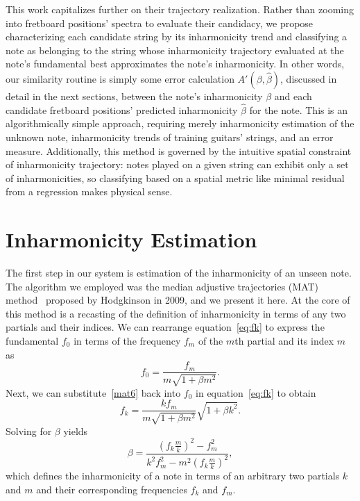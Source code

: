 \documentclass[12pt]{cmuthesis}
\begin{document}
This work capitalizes further on their trajectory realization. Rather than zooming into fretboard positions' spectra to evaluate their candidacy, we propose characterizing each candidate string by its inharmonicity trend and classifying a note as belonging to the string whose inharmonicity trajectory evaluated at the note's fundamental best approximates the note's inharmonicity. In other words, our similarity routine is simply some error calculation $A'(\beta,\hat{\beta})$, discussed in detail in the next sections, between the note's inharmonicity $\beta$ and each candidate fretboard positions' predicted inharmonicity $\hat{\beta}$ for the note. This is an algorithmically simple approach, requiring merely inharmonicity estimation of the unknown note, inharmonicity trends of training guitars' strings, and an error measure. Additionally, this method is governed by the intuitive spatial constraint of inharmonicity trajectory: notes played on a given string can exhibit only a set of inharmonicities, so classifying based on a spatial metric like minimal residual from a regression makes physical sense.

\section{Inharmonicity Estimation}
The first step in our system is estimation of the inharmonicity of an unseen note. The algorithm we employed was the median adjustive trajectories (MAT) method~\cite{hodgkinson2009} proposed by Hodgkinson in 2009, and we present it here. At the core of this method is a recasting of the definition of inharmonicity in terms of any two partials and their indices. We can rearrange equation~\eqref{eq:fk} to express the fundamental $f_0$ in terms of the frequency $f_m$ of the $m$th partial and its index $m$ as
\begin{equation}
\label{mat6}
f_0 = \frac{f_m}{m\sqrt{1+\beta m^2}}.
\end{equation}
Next, we can substitute~\eqref{mat6} back into $f_0$ in equation~\eqref{eq:fk} to obtain
\begin{equation}
\label{mat7}
f_k = \frac{kf_m}{m\sqrt{1+\beta m^2}}\sqrt{1+\beta k^2}.
\end{equation}
Solving for $\beta$ yields
\begin{equation}
\label{mat8}
\beta = \frac{(f_k\frac{m}{k})^2-f_m^2}{k^2f_m^2-m^2(f_k\frac{m}{k})^2},
\end{equation}
which defines the inharmonicity of a note in terms of an arbitrary two partials $k$ and $m$ and their corresponding frequencies $f_k$ and $f_m$.
\end{document}
